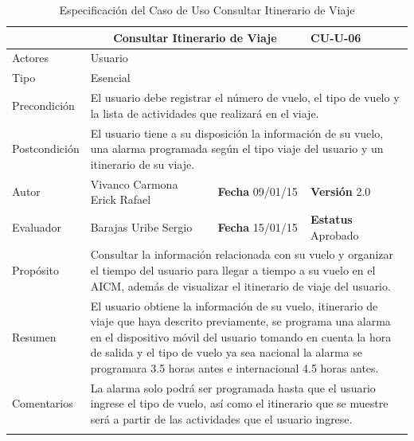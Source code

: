 \begin{longtable}{|p{2.5cm}|p{6.4cm}|p{2cm}|p{2cm}|}
	\hline
		\rowcolor[RGB]{255,102,102}{Caso de Uso}&\multicolumn{2}{c}{Consultar Itinerario de Viaje}&{\textbf{CU-U-06}}\\
	\hline
		{Actores}&\multicolumn{3}{p{11.2cm}|}{Usuario}\\
	\hline
		{Tipo}&\multicolumn{3}{p{11.2cm}|}{Esencial}\\
	\hline
		{Precondición}&\multicolumn{3}{p{11.2cm}|}{El usuario debe registrar el número de vuelo, el tipo de vuelo y la lista de actividades que realizará en el viaje.}\\
	\hline
		{Postcondición}&\multicolumn{3}{p{11.2cm}|}{El usuario tiene a su disposición la información de su vuelo, una alarma programada según el tipo viaje del usuario y un itinerario de su viaje.}\\
	\hline
		{Autor}&{Vivanco Carmona Erick Rafael}&{\textbf{Fecha} 09/01/15}&{\textbf{Versión} 2.0}\\
			\hline
		{Evaluador}&{Barajas Uribe Sergio}&{\textbf{Fecha} 15/01/15}&{\textbf{Estatus} Aprobado}\\
	\hline
		{Propósito}&\multicolumn{3}{p{11.2cm}|}{Consultar la información relacionada con su vuelo y organizar el tiempo del usuario para llegar a tiempo a su vuelo en el AICM, además de visualizar el itinerario de viaje del usuario.}\\
	\hline
		{Resumen}&\multicolumn{3}{p{11.2cm}|}{El usuario obtiene la información de su vuelo, itinerario de viaje que haya descrito previamente, se programa una alarma en el dispositivo móvil del usuario tomando en cuenta la hora de salida y el tipo de vuelo ya sea nacional la alarma se programara 3.5 horas antes e internacional 4.5 horas antes.}\\	
	\hline
		{Comentarios}&\multicolumn{3}{p{11.2cm}|}{La alarma solo podrá ser programada hasta que el usuario ingrese el tipo de vuelo, así como el itinerario que se muestre será a partir de las actividades que el usuario ingrese.}\\	
	\hline
	\caption[Especificación del Caso de Uso Consultar Itinerario de Viaje]{Especificación del Caso de Uso Consultar Itinerario de Viaje}
    	\label{tab:cuConsultarItinerarioViaje}
\end{longtable}
\newpage
